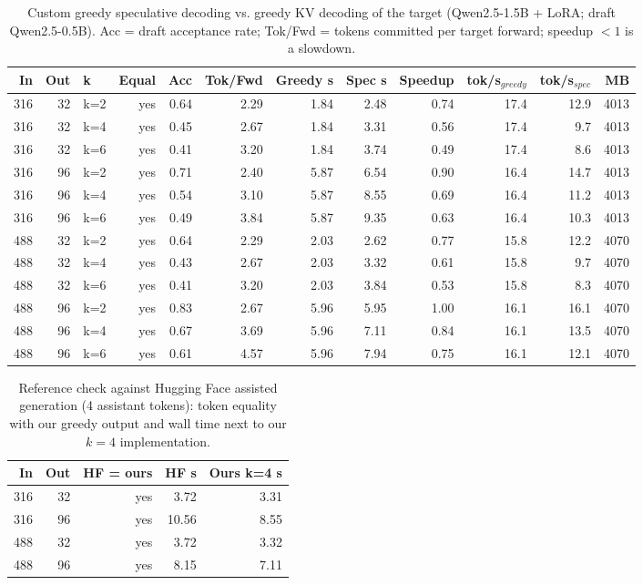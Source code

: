 \begin{table}[t]
\centering
\caption{Custom greedy speculative decoding vs. greedy KV decoding of the target (Qwen2.5-1.5B + LoRA; draft Qwen2.5-0.5B). Acc = draft acceptance rate; Tok/Fwd = tokens committed per target forward; speedup $<1$ is a slowdown.}
\label{tab:spec}
\footnotesize
\begin{tabular}{rrlrrrrrrrrr}
\toprule
In & Out & k & Equal & Acc & Tok/Fwd & Greedy s & Spec s & Speedup & tok/s$_{greedy}$ & tok/s$_{spec}$ & MB \\
\midrule
316 & 32 & k=2 & yes & 0.64 & 2.29 & 1.84 & 2.48 & 0.74 & 17.4 & 12.9 & 4013 \\
316 & 32 & k=4 & yes & 0.45 & 2.67 & 1.84 & 3.31 & 0.56 & 17.4 & 9.7 & 4013 \\
316 & 32 & k=6 & yes & 0.41 & 3.20 & 1.84 & 3.74 & 0.49 & 17.4 & 8.6 & 4013 \\
316 & 96 & k=2 & yes & 0.71 & 2.40 & 5.87 & 6.54 & 0.90 & 16.4 & 14.7 & 4013 \\
316 & 96 & k=4 & yes & 0.54 & 3.10 & 5.87 & 8.55 & 0.69 & 16.4 & 11.2 & 4013 \\
316 & 96 & k=6 & yes & 0.49 & 3.84 & 5.87 & 9.35 & 0.63 & 16.4 & 10.3 & 4013 \\
488 & 32 & k=2 & yes & 0.64 & 2.29 & 2.03 & 2.62 & 0.77 & 15.8 & 12.2 & 4070 \\
488 & 32 & k=4 & yes & 0.43 & 2.67 & 2.03 & 3.32 & 0.61 & 15.8 & 9.7 & 4070 \\
488 & 32 & k=6 & yes & 0.41 & 3.20 & 2.03 & 3.84 & 0.53 & 15.8 & 8.3 & 4070 \\
488 & 96 & k=2 & yes & 0.83 & 2.67 & 5.96 & 5.95 & 1.00 & 16.1 & 16.1 & 4070 \\
488 & 96 & k=4 & yes & 0.67 & 3.69 & 5.96 & 7.11 & 0.84 & 16.1 & 13.5 & 4070 \\
488 & 96 & k=6 & yes & 0.61 & 4.57 & 5.96 & 7.94 & 0.75 & 16.1 & 12.1 & 4070 \\
\bottomrule
\end{tabular}
\end{table}

\begin{table}[t]
\centering
\caption{Reference check against Hugging Face assisted generation (4 assistant tokens): token equality with our greedy output and wall time next to our $k{=}4$ implementation.}
\label{tab:hf}
\footnotesize
\begin{tabular}{rrrrr}
\toprule
In & Out & HF = ours & HF s & Ours k=4 s \\
\midrule
316 & 32 & yes & 3.72 & 3.31 \\
316 & 96 & yes & 10.56 & 8.55 \\
488 & 32 & yes & 3.72 & 3.32 \\
488 & 96 & yes & 8.15 & 7.11 \\
\bottomrule
\end{tabular}
\end{table}
